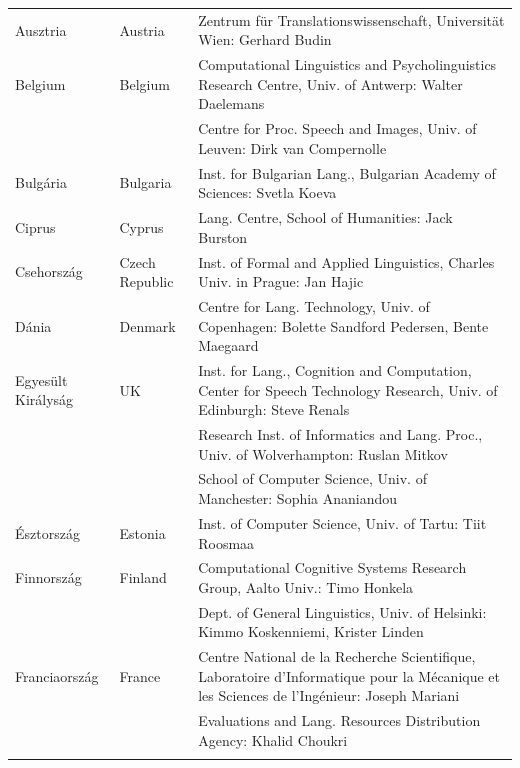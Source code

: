 \small
\begin{longtable}{llp{105mm}}
  Ausztria & \textcolor{grey1}{Austria} & Zentrum für Translationswissenschaft, Universität Wien: Gerhard Budin\\ \addlinespace
  Belgium & \textcolor{grey1}{Belgium} & Computational Linguistics and Psycholinguistics Research Centre, Univ. of Antwerp: Walter Daelemans\\ \addlinespace
  & & Centre for Proc. Speech and Images, Univ. of Leuven: Dirk van Compernolle \\ \addlinespace
  Bulgária & \textcolor{grey1}{Bulgaria} & Inst. for Bulgarian Lang., Bulgarian Academy of Sciences: Svetla Koeva \\ \addlinespace
  Ciprus & \textcolor{grey1}{Cyprus} & Lang. Centre, School of Humanities: Jack Burston \\ \addlinespace
  Csehország & \textcolor{grey1}{Czech Republic} & Inst. of Formal and Applied Linguistics, Charles Univ. in Prague: Jan Hajic \\ \addlinespace
  Dánia &  \textcolor{grey1}{Denmark} & Centre for Lang. Technology, Univ. of Copenhagen: Bolette Sandford Pedersen, Bente Maegaard\\ \addlinespace
  Egyesült Királyság & \textcolor{grey1}{UK} & Inst. for Lang., Cognition and Computation, Center for Speech Technology Research, Univ. of Edinburgh: Steve Renals \\ \addlinespace 
  & & Research Inst. of Informatics and Lang. Proc., Univ. of Wolverhampton: Ruslan Mitkov \\ \addlinespace 
  & & School of Computer Science, Univ. of Manchester: Sophia Ananiandou \\ \addlinespace 
  Észtország & \textcolor{grey1}{Estonia} & Inst. of Computer Science, Univ. of Tartu: Tiit Roosmaa\\ \addlinespace
  Finnország & \textcolor{grey1}{Finland} & Computational Cognitive Systems Research Group, Aalto Univ.: Timo Honkela\\ \addlinespace
  & & Dept. of General Linguistics, Univ. of Helsinki: Kimmo Koskenniemi, Krister Linden \\ \addlinespace
  Franciaország & \textcolor{grey1}{France} & Centre National de la Recherche Scientifique, Laboratoire d'Informatique pour la Mécanique et les Sciences de l'Ingénieur: Joseph Mariani \\ \addlinespace
  & & Evaluations and Lang. Resources Distribution Agency: Khalid Choukri\\ \addlinespace 

\end{longtable}
